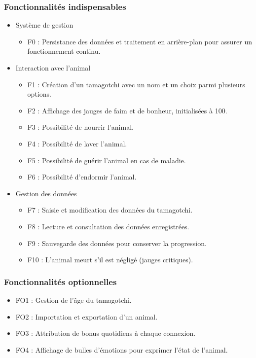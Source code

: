 \documentclass{rapportECL}
\begin{document}
\subsubsection{Fonctionnalités indispensables}
\begin{itemize}[label=\textbullet]
\item Système de gestion
\begin{itemize}[label=\textendash]
\item F0 : Persistance des données et traitement en arrière-plan pour assurer un fonctionnement continu.
\end{itemize}
\item Interaction avec l’animal
\begin{itemize}[label=\textendash]
\item F1 : Création d’un tamagotchi avec un nom et un choix parmi plusieurs options.

\item F2 : Affichage des jauges de faim et de bonheur, initialisées à 100.

\item F3 : Possibilité de nourrir l’animal.

\item F4 : Possibilité de laver l’animal.

\item F5 : Possibilité de guérir l’animal en cas de maladie.

\item F6 : Possibilité d’endormir l’animal.
\end{itemize}
\item Gestion des données
\begin{itemize}[label=\textendash]
\item F7 : Saisie et modification des données du tamagotchi.

\item F8 : Lecture et consultation des données enregistrées.

\item F9 : Sauvegarde des données pour conserver la progression.

\item F10 : L’animal meurt s’il est négligé (jauges critiques).
\end{itemize}
\end{itemize}
\subsubsection{Fonctionnalités optionnelles}
\begin{itemize}[label=\textendash]
\item FO1 : Gestion de l’âge du tamagotchi.

\item FO2 : Importation et exportation d’un animal.

\item FO3 : Attribution de bonus quotidiens à chaque connexion.

\item FO4 : Affichage de bulles d’émotions pour exprimer l’état de l’animal.
\end{itemize}
\end{document}
